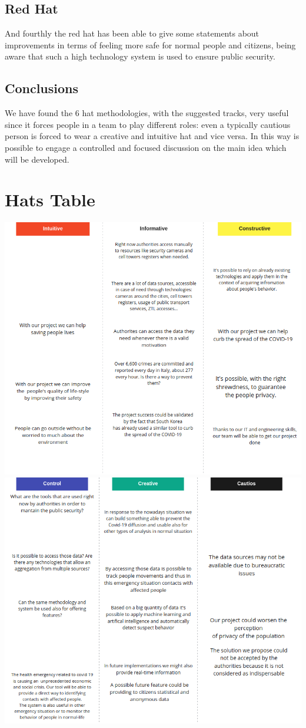\documentclass[../main.tex]{subfiles}
\begin{document}
    \subsection{Red Hat}\label{subsec:red-hat}
    And fourthly the red hat has been able to give some statements about improvements in terms of feeling more safe for normal people and citizens, being aware that such a high technology system is used to ensure public security.
    
    \subsection{Conclusions}\label{subsec:conclusions}
    We have found the 6 hat methodologies, with the suggested tracks, very useful since it forces people in a team to play different roles: even a typically cautious person is forced to wear a creative and intuitive hat and vice versa. In this way is possible to engage a controlled and focused discussion on the main idea which will be developed.

    \section{Hats Table}\label{sec:hats-table}
    \includegraphics[scale = 0.5]{assets/hat1.png} \\
    \includegraphics[scale = 0.5]{assets/hat2.png}
\end{document}
